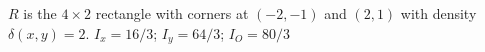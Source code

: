 {$R$ is the $4\times 2$ rectangle with corners at $(-2,-1)$ and $(2,1)$ with density $\delta(x,y) = 2$. 
}
{$I_x = 16/3$; $I_y = 64/3$; $I_O = 80/3$
}